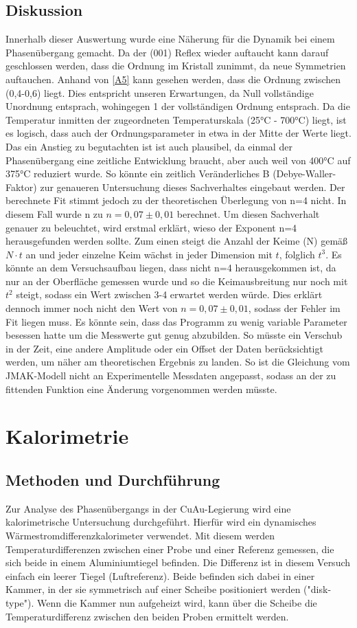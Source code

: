 \documentclass[
	a4paper,
	12pt,
	pagesize,
	ngerman
]{scrartcl}
\begin{document}
\subsection{Diskussion}
Innerhalb dieser Auswertung wurde eine Näherung für die Dynamik bei einem Phasenübergang gemacht. Da der (001) Reflex wieder auftaucht kann darauf geschlossen werden, dass die Ordnung im Kristall zunimmt, da neue Symmetrien auftauchen. Anhand von \cref{A5} kann gesehen werden, dass die Ordnung zwischen (0,4-0,6) liegt. Dies entspricht unseren Erwartungen, da Null vollständige Unordnung entsprach, wohingegen 1 der vollständigen Ordnung entsprach. Da die Temperatur inmitten der zugeordneten Temperaturskala (25°C - 700°C) liegt, ist es logisch, dass auch der Ordnungsparameter in etwa in der Mitte der Werte liegt. Das ein Anstieg zu begutachten ist ist auch plausibel, da einmal der Phasenübergang eine zeitliche Entwicklung braucht, aber auch weil von 400°C auf 375°C reduziert wurde. So könnte ein zeitlich Veränderliches B (Debye-Waller-Faktor) zur genaueren Untersuchung dieses Sachverhaltes eingebaut werden. Der berechnete Fit stimmt jedoch zu der theoretischen Überlegung von n=4 nicht. In diesem Fall wurde n zu $n=0,07 \pm 0,01$ berechnet. Um diesen Sachverhalt genauer zu beleuchtet, wird erstmal erklärt, wieso der Exponent n=4  herausgefunden werden sollte. Zum einen steigt die Anzahl der Keime (N) gemäß $N \cdot t$ an und jeder einzelne Keim wächst in jeder Dimension mit $t$, folglich $t^3$. Es könnte an dem Versuchsaufbau liegen, dass nicht n=4 herausgekommen ist, da nur an der Oberfläche gemessen wurde und so die Keimausbreitung nur noch mit $t^2$ steigt, sodass ein Wert zwischen 3-4 erwartet werden würde. Dies erklärt dennoch immer noch nicht den Wert von $n=0,07 \pm 0,01$, sodass der Fehler im Fit liegen muss. Es könnte sein, dass das Programm zu wenig variable Parameter besessen hatte um die Messwerte gut genug abzubilden. So müsste ein Verschub in der Zeit, eine andere Amplitude oder ein Offset der Daten berücksichtigt werden, um näher am theoretischen Ergebnis zu landen. So ist die Gleichung vom JMAK-Modell nicht an Experimentelle Messdaten angepasst, sodass an der zu fittenden Funktion eine Änderung vorgenommen werden müsste.


\section{Kalorimetrie}
\subsection{Methoden und Durchführung}
Zur Analyse des Phasenübergangs in der CuAu-Legierung wird eine kalorimetrische Untersuchung durchgeführt. Hierfür wird ein dynamisches Wärmestromdifferenzkalorimeter verwendet. Mit diesem werden Temperaturdifferenzen zwischen einer Probe und einer Referenz gemessen, die sich beide in einem Aluminiumtiegel befinden. Die Differenz ist in diesem Versuch einfach ein leerer Tiegel (Luftreferenz). Beide befinden sich dabei in einer Kammer, in der sie symmetrisch auf einer Scheibe positioniert werden ("disk-type"). Wenn die Kammer nun aufgeheizt wird, kann über die Scheibe die Temperaturdifferenz zwischen den beiden Proben ermittelt werden.
\end{document}
